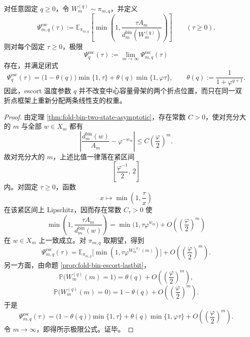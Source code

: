 \begin{theorem}\label{thm:xi-time-part70b-escort-two-kink-response}
对任意固定 \(q\ge 0\)，令 \(W_m^{(q)}\sim \pi_{m,q}\)，并定义
\[
\Psi_{m,q}^{\mathrm{esc}}(\tau)
:=
\mathbb E_{\pi_{m,q}}
\left[
\min\!\left(
1,\frac{\tau A_m}{d_m^{\mathrm{bin}}(W_m^{(q)})}
\right)
\right]
\qquad (\tau\ge 0).
\]
则对每个固定 \(\tau\ge 0\)，极限
\[
\Psi_q^{\mathrm{esc}}(\tau):=
\lim_{m\to\infty}\Psi_{m,q}^{\mathrm{esc}}(\tau)
\]
存在，并满足闭式
\[
\Psi_q^{\mathrm{esc}}(\tau)
=
\bigl(1-\theta(q)\bigr)\min\{1,\tau\}
+
\theta(q)\min\{1,\varphi\tau\},
\qquad
\theta(q):=\frac{1}{1+\varphi^{q+1}}.
\]
因此，escort 温度参数 \(q\) 并不改变中心容量骨架的两个折点位置，而只在同一双折点框架上重新分配两条线性支的权重。
\end{theorem}
\begin{proof}
由定理 \ref{thm:fold-bin-two-state-asymptotic}，存在常数 \(C>0\)，使对充分大的 \(m\) 与全部 \(w\in X_m\) 都有
\[
\left|
\frac{d_m^{\mathrm{bin}}(w)}{A_m}-\varphi^{-w_m}
\right|
\le C\left(\frac{\varphi}{2}\right)^m.
\]
故对充分大的 \(m\)，上述比值一律落在紧区间
\[
\left[\frac{\varphi^{-1}}{2},\,2\right]
\]
内。对固定 \(\tau\ge 0\)，函数
\[
x\longmapsto \min\!\left(1,\frac{\tau}{x}\right)
\]
在该紧区间上 Lipschitz，因而存在常数 \(C_\tau>0\) 使
\[
\min\!\left(1,\frac{\tau A_m}{d_m^{\mathrm{bin}}(w)}\right)
=
\min\!\bigl(1,\tau\varphi^{w_m}\bigr)
+O\!\left(\left(\frac{\varphi}{2}\right)^m\right)
\]
在 \(w\in X_m\) 上一致成立。对 \(\pi_{m,q}\) 取期望，得到
\[
\Psi_{m,q}^{\mathrm{esc}}(\tau)
=
\mathbb E_{\pi_{m,q}}\!\bigl[\min(1,\tau\varphi^{W_m^{(q)}(m)})\bigr]
+O\!\left(\left(\frac{\varphi}{2}\right)^m\right).
\]
另一方面，由命题 \ref{prop:fold-bin-escort-lastbit}，
\[
\mathbb P\bigl(W_m^{(q)}(m)=1\bigr)
=
\theta(q)+O\!\left(\left(\frac{\varphi}{2}\right)^m\right),
\]
\[
\mathbb P\bigl(W_m^{(q)}(m)=0\bigr)
=
1-\theta(q)+O\!\left(\left(\frac{\varphi}{2}\right)^m\right).
\]
于是
\[
\Psi_{m,q}^{\mathrm{esc}}(\tau)
=
\bigl(1-\theta(q)\bigr)\min\{1,\tau\}
+
\theta(q)\min\{1,\varphi\tau\}
+O\!\left(\left(\frac{\varphi}{2}\right)^m\right).
\]
令 \(m\to\infty\)，即得所示极限公式。证毕。
\end{proof}

